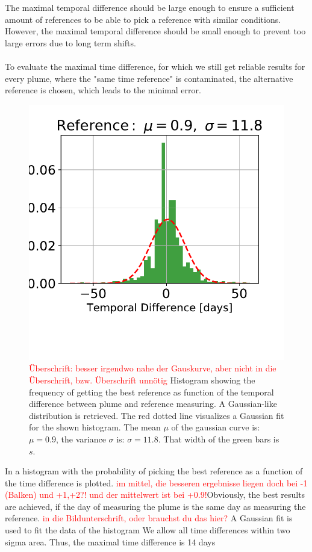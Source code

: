 The maximal temporal difference should be large enough to ensure a sufficient amount of references to be able to pick a reference with similar conditions. However, the maximal temporal difference should be small enough to prevent too large  errors due to long term shifts.\\
\\
To evaluate the maximal time difference, for which we still get reliable results for every plume, where the "same time reference" is contaminated, the alternative reference is chosen, which leads to the minimal  error.\\
\begin{figure}
	\centering
	\includegraphics[width=0.7\linewidth]{Bilder/Hist}
	\caption{\textcolor{red}{Überschrift: besser irgendwo nahe der Gauskurve, aber nicht in die Überschrift,  bzw. Überschrift unnötig} Histogram showing the frequency of getting the best reference as function of the temporal difference between plume and reference measuring. A Gaussian-like distribution is retrieved. The red dotted line visualizes a Gaussian fit for the shown histogram. The mean $\mu$ of the gaussian curve is: $\mu = 0.9$, the variance $\sigma$ is: $\sigma = 11.8$. That width of the green bars is $s $.}
	\label{fig:Hist}
\end{figure}
%
In  a histogram with the probability of picking the best reference as a function of the time difference is plotted. \textcolor{red}{im mittel, die besseren ergebnisse liegen doch bei -1 (Balken) und +1,+2?! und der mittelwert ist bei +0.9!}Obviously, the best results are achieved, if the day of measuring the plume is the same day as measuring the reference. \textcolor{red}{in die Bildunterschrift, oder brauchst du das hier?} A Gaussian fit is used to fit the data of the histogram We allow all time differences within two sigma area. Thus, the maximal time difference is 14 days\\


